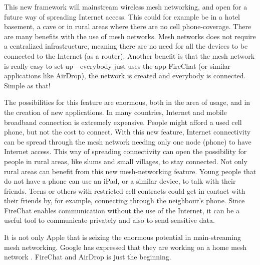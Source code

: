 This new framework will mainstream wireless mesh networking, and open for a future way of spreading Internet access. This could for example be in a hotel basement, a cave or in rural areas where there are no cell phone-coverage. There are many benefits with the use of mesh networks. Mesh networks does not require a centralized infrastructure, meaning there are no need for all the devices to be connected to the Internet (as a router). Another benefit is that the mesh network is really easy to set up - everybody just uses the app FireChat (or similar applications like AirDrop), the network is created and everybody is connected. Simple as that! 

The possibilities for this feature are enormous, both in the area of usage, and in the creation of new applications. In many countries, Internet and mobile broadband connection is extremely expensive. People might afford a used cell phone, but not the cost to connect. With this new feature, Internet connectivity can be spread through the mesh network needing only one node (phone) to have Internet access. This way of spreading connectivity can open the possibility for people in rural areas, like slums and small villages, to stay connected. Not only rural areas can benefit from this new mesh-networking feature. Young people that do not have a phone can use an iPad, or a similar device, to talk with their friends. Teens or others with restricted cell contracts could get in contact with their friends by, for example, connecting through the neighbour's phone. Since FireChat enables communication without the use of the Internet, it can be a useful tool to communicate privately and also to send sensitive data.
 
It is not only Apple that is seizing the enormous potential in main-streaming mesh networking. Google has expressed that they are working on a home mesh network \cite{googleMesh}. FireChat and AirDrop is just the beginning.